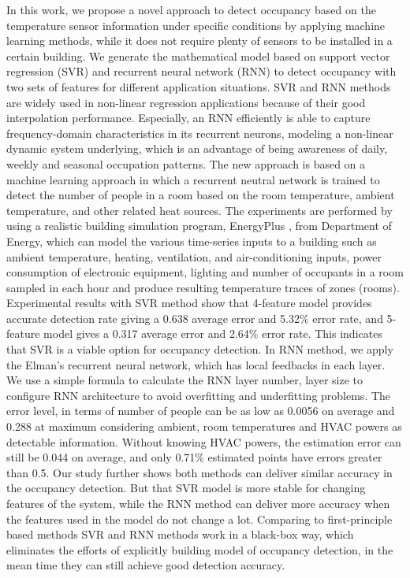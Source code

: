 In this work, we propose a novel approach to detect occupancy based on the
temperature sensor information under specific conditions by applying machine
learning methods, while it does not require plenty of sensors to be installed
in a certain building.  We generate the mathematical model based on support
vector regression (SVR) and recurrent neural network (RNN) to detect occupancy
with two sets of features for different application situations. SVR and RNN
methods are widely used in non-linear regression applications because of their
good interpolation performance. Especially, an RNN efficiently is able to
capture frequency-domain characteristics in its recurrent neurons, modeling a
non-linear dynamic system underlying, which is an advantage of being awareness
of daily, weekly and seasonal occupation patterns.  The new approach is based
on a machine learning approach in which a recurrent neutral network is trained
to detect the number of people in a room based on the room temperature, ambient
temperature, and other related heat sources. The experiments are performed by
using a realistic building simulation program, EnergyPlus
\cite{energyplus:2001vf}, from Department of Energy, which can model the
various time-series inputs to a building such as ambient temperature, heating,
ventilation, and air-conditioning inputs, power consumption of electronic
equipment, lighting and number of occupants in a room sampled in each hour and
produce resulting temperature traces of zones (rooms).  Experimental results
with SVR method show that 4-feature model provides accurate detection rate
giving a 0.638 average error and 5.32\% error rate, and 5-feature model gives
a 0.317 average error and 2.64\% error rate. This indicates that SVR is a
viable option for occupancy detection.  In RNN method, we apply the Elman's
recurrent neural network, which has local feedbacks in each layer. We use a
simple formula to calculate the RNN layer number, layer size to configure RNN
architecture to avoid overfitting and underfitting problems. The error level,
in terms of number of people can be as low as 0.0056 on average and 0.288 at
maximum considering ambient, room temperatures and HVAC powers as detectable
information. Without knowing HVAC powers, the estimation error can still be
0.044 on average, and only 0.71\% estimated points have errors greater than
0.5. Our study further shows both methods can deliver similar accuracy in the
occupancy detection.  But that SVR model is more stable for changing features
of the system, while the RNN method can deliver more accuracy when the features
used in the model do not change a lot.  Comparing to first-principle based
methods SVR and RNN methods work in a black-box way, which eliminates the
efforts of explicitly building model of occupancy detection, in the mean time
they can still achieve good detection accuracy.

